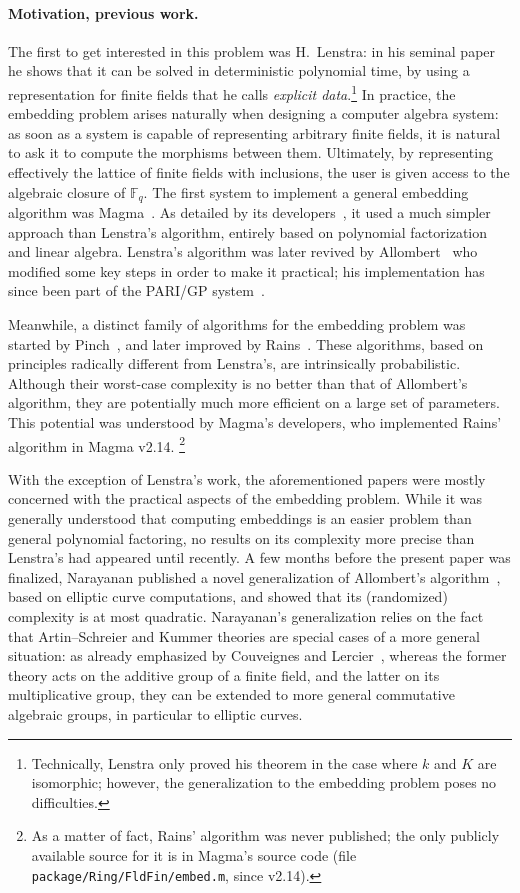 \documentclass{mcom-l}
\theoremstyle{plain}
\theoremstyle{definition}
\newcommand{\F}{\ensuremath{\mathbb{F}}}
\newcounter{algorithm}
\begin{document}
\paragraph{\bf Motivation, previous work.}
The first to get interested in this problem was H.~Lenstra: in his
seminal paper~\cite{LenstraJr91} he shows that it can be solved in
deterministic polynomial time, by using a representation for finite
fields that he calls \emph{explicit data}.\footnote{Technically,
  Lenstra only proved his theorem in the case where $k$ and $K$ are
  isomorphic; however, the generalization to the embedding problem
  poses no difficulties.} %
In practice, the embedding problem arises naturally when designing a
computer algebra system: as soon as a system is capable of
representing arbitrary finite fields, it is natural to ask it to
compute the morphisms between them. %
Ultimately, by representing effectively the lattice of finite fields
with inclusions, the user is given access to the algebraic closure of
$\F_q$. %
The first system to implement a general embedding algorithm was
Magma~\cite{MAGMA}. %
As detailed by its developers~\cite{bosma+cannon+steel97}, it used a
much simpler approach than Lenstra's algorithm, entirely based on
polynomial factorization and linear algebra. %
Lenstra's algorithm was later revived by
Allombert~\cite{Allombert02,Allombert02-rev} who modified some key
steps in order to make it practical; his implementation has since been
part of the PARI/GP system~\cite{Pari}.

Meanwhile, a distinct family of algorithms for the embedding problem
was started by Pinch~\cite{Pinch}, and later improved by
Rains~\cite{rains2008}. %
These algorithms, based on principles radically different from
Lenstra's, are intrinsically probabilistic. %
Although their worst-case complexity is no better than that of
Allombert's algorithm, they are potentially much more efficient on a
large set of parameters. %
This potential was understood by Magma's developers, who implemented
Rains' algorithm in Magma v2.14.%
\footnote{As a matter of fact, Rains' algorithm was never published;
  the only publicly available source for it is in Magma's source code
  (file \texttt{package/Ring/FldFin/embed.m}, since v2.14).}

With the exception of Lenstra's work, the aforementioned papers were
mostly concerned with the practical aspects of the embedding
problem. %
While it was generally understood that computing embeddings is an
easier problem than general polynomial factoring, no results on its
complexity more precise than Lenstra's had appeared until recently. %
A few months before the present paper was finalized, Narayanan
published a novel generalization of Allombert's
algorithm~\cite{narayanan2016fast}, based on elliptic curve
computations, and showed that its (randomized) complexity is at most
quadratic.
Narayanan's
  generalization relies on the fact that Artin--Schreier and Kummer
  theories are special cases of a more general situation:
  as already emphasized by Couveignes and Lercier~\cite{CL08}, whereas
  the former theory acts on the additive group of a finite field, and
  the latter on its multiplicative group, they can be extended to more
  general commutative algebraic groups, in particular to elliptic
  curves.
\end{document}
